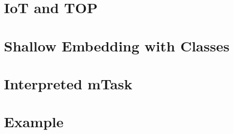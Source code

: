 
\section{IoT and TOP}

\section{Shallow Embedding with Classes}

\section{Interpreted mTask}

\section{Example}